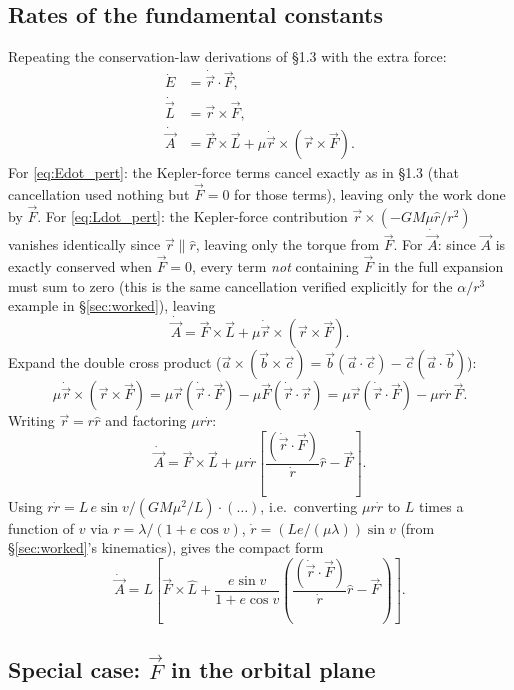 \documentclass[11pt]{article}
\newcommand{\vecr}{\vec r}
\newcommand{\vecL}{\vec L}
\newcommand{\vecA}{\vec A}
\newcommand{\vecF}{\vec F}
\newcommand{\rhat}{\hat r}
\begin{document}
\subsection{Rates of the fundamental constants}

Repeating the conservation-law derivations of \S1.3 with the extra force:
\begin{align}
\dot E &= \dot{\vecr}\cdot\vecF, \label{eq:Edot_pert}\\
\dot{\vecL} &= \vecr\times\vecF, \label{eq:Ldot_pert}\\
\dot{\vecA} &= \vecF\times\vecL + \mu\dot{\vecr}\times(\vecr\times\vecF). \label{eq:Adot_pert_raw}
\end{align}
For \eqref{eq:Edot_pert}: the Kepler-force terms cancel exactly as in \S1.3 (that cancellation used nothing but $\vecF=0$ for those terms), leaving only the work done by $\vecF$. For \eqref{eq:Ldot_pert}: the Kepler-force contribution $\vecr\times(-GM\mu\rhat/r^2)$ vanishes identically since $\vecr\parallel\rhat$, leaving only the torque from $\vecF$. For $\dot{\vecA}$: since $\vecA$ is exactly conserved when $\vecF=0$, every term \emph{not} containing $\vecF$ in the full expansion must sum to zero (this is the same cancellation verified explicitly for the $\alpha/r^3$ example in \S\ref{sec:worked}), leaving
\[
\dot{\vecA} = \vecF\times\vecL + \mu\dot{\vecr}\times(\vecr\times\vecF).
\]
Expand the double cross product ($\vec a\times(\vec b\times\vec c)=\vec b(\vec a\cdot\vec c)-\vec c(\vec a\cdot\vec b)$):
\[
\mu\dot{\vecr}\times(\vecr\times\vecF) = \mu\vecr(\dot{\vecr}\cdot\vecF)-\mu\vecF(\dot{\vecr}\cdot\vecr) = \mu\vecr(\dot{\vecr}\cdot\vecF)-\mu r\dot r\,\vecF.
\]
Writing $\vecr=r\rhat$ and factoring $\mu r\dot r$:
\[
\dot{\vecA} = \vecF\times\vecL + \mu r\dot r\left[\frac{(\dot{\vecr}\cdot\vecF)}{\dot r}\rhat - \vecF\right].
\]
Using $r\dot r = L\,e\sin v/(GM\mu^2/L)\cdot(\ldots)$, i.e.\ converting $\mu r\dot r$ to $L$ times a function of $v$ via $r=\lambda/(1+e\cos v)$, $\dot r = (L e/(\mu\lambda))\sin v$ (from \S\ref{sec:worked}'s kinematics), gives the compact form
\begin{equation}
\dot{\vecA} = L\left[\vecF\times\hat L + \frac{e\sin v}{1+e\cos v}\left(\frac{(\dot{\vecr}\cdot\vecF)}{\dot r}\rhat-\vecF\right)\right]. \label{eq:Adot_pert_compact}
\end{equation}

\subsection{Special case: $\vecF$ in the orbital plane}
\end{document}
